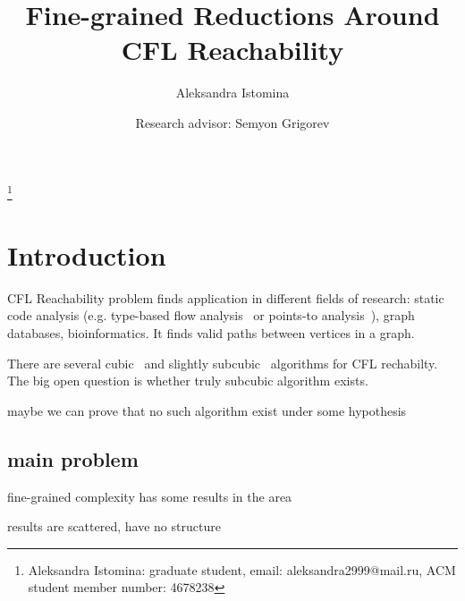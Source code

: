 \documentclass[acmsmall,review,nonacm]{acmart}\settopmatter{printfolios=true,printccs=false,printacmref=false}
\begin{document}
	
	\title{Fine-grained Reductions Around CFL Reachability}
	
	\author{Aleksandra Istomina}
	\thanks{Aleksandra Istomina: graduate student, email: aleksandra2999@mail.ru, ACM student member number: 4678238}

    \author{Research advisor: Semyon Grigorev}
	
	\newcommand\todo[1]{{\color{violet}#1}}
	\newcommand\db[1]{{\color{red}#1}}
	\newcommand\question[1]{{\color{cyan}#1}}


	\maketitle
	
	\section{Introduction}
	
	CFL Reachability problem finds application in different fields of research: static code analysis (e.g. type-based flow analysis~\cite{10.1145/373243.360208} or points-to analysis~\cite{10.1145/1103845.1094817, 10.1145/1133255.1134027}), graph databases, bioinformatics. It finds valid paths between vertices in a graph. 
	
	There are several cubic~\cite{10.1145/298514.298576, 10.1145/199448.199462} and slightly subcubic~\cite{10.1145/1328438.1328460} algorithms for CFL rechabilty. The big open question is whether truly subcubic algorithm exists. 
	
	maybe we can prove that no such algorithm exist under some hypothesis
	
	\subsection{\todo{main problem}}
	
	fine-grained complexity has some results in the area
	
	results are scattered, have no structure
	
\end{document}
